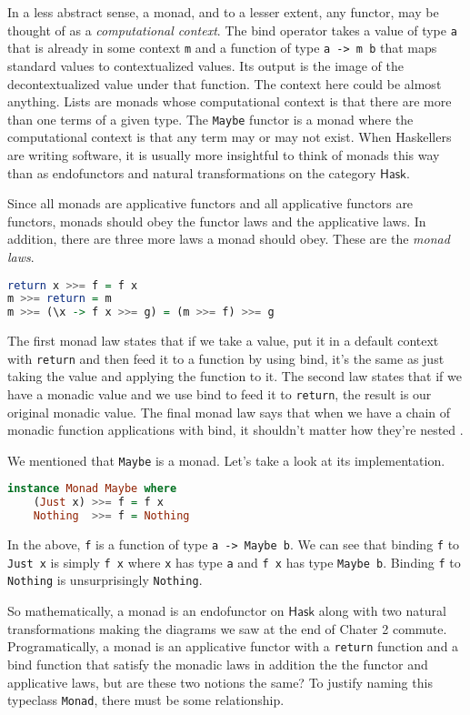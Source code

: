 \documentclass[MS, xcolor=dvipsnames]{wfuthesis}
\def\Hask{\mathsf{Hask}}
\theoremstyle{definition}
\begin{document}
In a less abstract sense, a monad, and to a lesser extent, any functor, may be thought of as a \emph{computational context}. The bind operator takes a value of type \lstinline{a} that is already in some context \lstinline{m} and a function of type \lstinline{a -> m b} that maps standard values to contextualized values. Its output is the image of the decontextualized value under that function. The context here could be almost anything. Lists are monads whose computational context is that there are more than one terms of a given type. The \lstinline{Maybe} functor is a monad where the computational context is that any term may or may not exist. When Haskellers are writing software, it is usually more insightful to think of monads this way than as endofunctors and natural transformations on the category $\Hask$. \par
Since all monads are applicative functors and all applicative functors are functors, monads should obey the functor laws and the applicative laws. In addition, there are three more laws a monad should obey. These are the \emph{monad laws}.
\begin{lstlisting}[language=Haskell]
return x >>= f = f x
m >>= return = m
m >>= (\x -> f x >>= g) = (m >>= f) >>= g
\end{lstlisting}
The first monad law states that if we take a value, put it in a default context with \lstinline{return} and then feed it to a function by using bind, it's the same as just taking the value and applying the function to it. The second law states that if we have a monadic value and we use bind to feed it to \lstinline{return}, the result is our original monadic value. The final monad law says that when we have a chain of monadic function applications with bind, it shouldn't matter how they're nested \cite{Lipovaca2011}. \par
We mentioned that \lstinline{Maybe} is a monad. Let's take a look at its implementation.
\begin{lstlisting}[language=Haskell]
instance Monad Maybe where
    (Just x) >>= f = f x
    Nothing  >>= f = Nothing
\end{lstlisting}
In the above, \lstinline{f} is a function of type \lstinline{a -> Maybe b}. We can see that binding \lstinline{f} to \lstinline{Just x} is simply \lstinline{f x} where \lstinline{x} has type \lstinline{a} and \lstinline{f x} has type \lstinline{Maybe b}. Binding \lstinline{f} to \lstinline{Nothing} is unsurprisingly \lstinline{Nothing}. \par
So mathematically, a monad is an endofunctor on $\Hask$ along with two natural transformations making the diagrams we saw at the end of Chater 2 commute. Programatically, a monad is an applicative functor with a \lstinline{return} function and a bind function that satisfy the monadic laws in addition the the functor and applicative laws, but are these two notions the same? To justify naming this typeclass \lstinline{Monad}, there must be some relationship. \par
\end{document}
